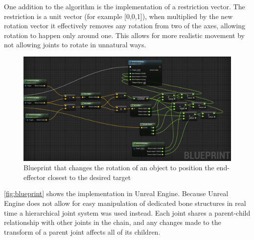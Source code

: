 One addition to the algorithm is the implementation of a restriction vector. The restriction is a unit vector (for example [0,0,1]), when multiplied by the new rotation vector it effectively removes any rotation from two of the axes, allowing rotation to happen only around one. This allows for more realistic movement by not allowing joints to rotate in unnatural ways.
 \begin{figure}[h]
 \centering
 \includegraphics[width=\textwidth]{CCD/CCDBlueprint.png}
 \caption{Blueprint that changes the rotation of an object to position the end-effector closest to the desired target}
 \label{fig:blueprint}
 \end{figure}
 
\autoref{fig:blueprint} shows the implementation in Unreal Engine.
Because Unreal Engine does not allow for easy manipulation of dedicated bone structures in real time a hierarchical joint system was used instead. Each joint shares a parent-child relationship with other joints in the chain, and any changes made to the transform of a parent joint affects all of its children.

